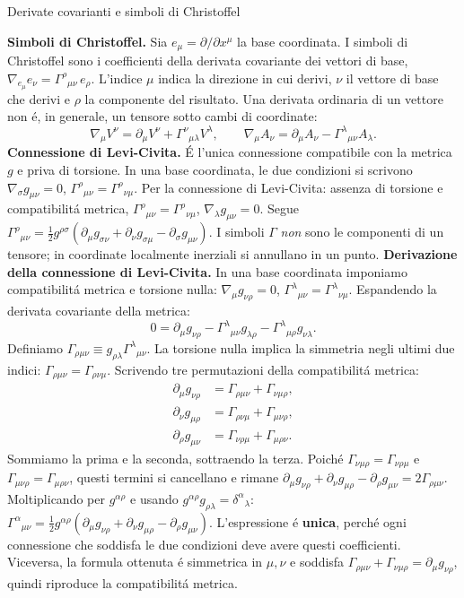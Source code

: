 \begin{frame}[t]{Derivate covarianti e simboli di Christoffel}\small\raggedright
    \textbf{Simboli di Christoffel.} Sia \(e_\mu=\partial/\partial x^\mu\) la base coordinata. I simboli di Christoffel sono i coefficienti della derivata covariante dei vettori di base, $\nabla_{e_\mu}e_\nu=\Gamma^\rho{}_{\mu\nu}\,e_\rho$.
L'indice \(\mu\) indica la direzione in cui derivi, \(\nu\) il vettore di base che derivi e \(\rho\) la componente del risultato.
Una derivata ordinaria di un vettore non \'e, in generale, un tensore sotto cambi di coordinate:
\[
\nabla_\mu V^\nu=\partial_\mu V^\nu+\Gamma^\nu{}_{\mu\lambda}V^\lambda,
\qquad
\nabla_\mu A_\nu=\partial_\mu A_\nu-\Gamma^\lambda{}_{\mu\nu}A_\lambda.
\]
\textbf{Connessione di Levi-Civita.} \'E l'unica connessione compatibile con la metrica \(g\) e priva di torsione. In una base coordinata, le due condizioni si scrivono $\nabla_\sigma g_{\mu\nu}=0$, $\Gamma^\rho{}_{\mu\nu}=\Gamma^\rho{}_{\nu\mu}$. Per la connessione di Levi-Civita: assenza di torsione e compatibilit\'a metrica, $\Gamma^\rho{}_{\mu\nu}=\Gamma^\rho{}_{\nu\mu}$, $\nabla_\lambda g_{\mu\nu}=0$. Segue $\Gamma^\rho{}_{\mu\nu}=\frac12 g^{\rho\sigma}(\partial_\mu g_{\sigma\nu}+\partial_\nu g_{\sigma\mu}-\partial_\sigma g_{\mu\nu})$. I simboli $\Gamma$ \emph{non} sono le componenti di un tensore; in coordinate localmente inerziali si annullano in un punto. \textbf{Derivazione della connessione di Levi-Civita.} In una base coordinata imponiamo compatibilit\'a metrica e torsione nulla: $\nabla_\mu g_{\nu\rho}=0$, $\Gamma^\lambda{}_{\mu\nu}=\Gamma^\lambda{}_{\nu\mu}$. Espandendo la derivata covariante della metrica:
\[
0=\partial_\mu g_{\nu\rho}
-\Gamma^\lambda{}_{\mu\nu}g_{\lambda\rho}
-\Gamma^\lambda{}_{\mu\rho}g_{\nu\lambda}.
\]
Definiamo $\Gamma_{\rho\mu\nu}\equiv g_{\rho\lambda}\Gamma^\lambda{}_{\mu\nu}$. La torsione nulla implica la simmetria negli ultimi due indici: $\Gamma_{\rho\mu\nu}=\Gamma_{\rho\nu\mu}$.
Scrivendo tre permutazioni della compatibilit\'a metrica:
\[
\begin{aligned}
\partial_\mu g_{\nu\rho}
&=\Gamma_{\rho\mu\nu}+\Gamma_{\nu\mu\rho},\\
\partial_\nu g_{\mu\rho}
&=\Gamma_{\rho\nu\mu}+\Gamma_{\mu\nu\rho},\\
\partial_\rho g_{\mu\nu}
&=\Gamma_{\nu\rho\mu}+\Gamma_{\mu\rho\nu}.
\end{aligned}
\]
Sommiamo la prima e la seconda, sottraendo la terza. Poich\'e $\Gamma_{\nu\mu\rho}=\Gamma_{\nu\rho\mu}$ e $\Gamma_{\mu\nu\rho}=\Gamma_{\mu\rho\nu}$, questi termini si cancellano e rimane $\partial_\mu g_{\nu\rho}+\partial_\nu g_{\mu\rho}-\partial_\rho g_{\mu\nu}=2\Gamma_{\rho\mu\nu}$. Moltiplicando per $g^{\alpha\rho}$ e usando $g^{\alpha\rho}g_{\rho\lambda}=\delta^\alpha{}_\lambda$: $\Gamma^\alpha{}_{\mu\nu}=\frac12g^{\alpha\rho}\left(\partial_\mu g_{\nu\rho}+\partial_\nu g_{\mu\rho}-\partial_\rho g_{\mu\nu}\right)$. L'espressione \'e \textbf{unica}, perch\'e ogni connessione che soddisfa le due condizioni deve avere questi coefficienti. Viceversa, la formula ottenuta \'e simmetrica in $\mu,\nu$ e soddisfa $\Gamma_{\rho\mu\nu}+\Gamma_{\nu\mu\rho}=\partial_\mu g_{\nu\rho}$, quindi riproduce la compatibilit\'a metrica.
\end{frame}

